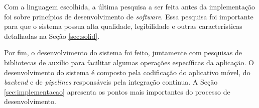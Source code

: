 Com a linguagem escolhida, a última pesquisa a ser feita antes da implementação foi sobre princípios de desenvolvimento de \textit{software}. Essa pesquisa foi importante para que o sistema possua alta qualidade, legibilidade e outras características detalhadas na Seção \ref{sec:solid}.

Por fim, o desenvolvimento do sistema foi feito, juntamente com pesquisas de bibliotecas de auxílio para facilitar algumas operações específicas da aplicação. O desenvolvimento do sistema é composto pela codificação do aplicativo móvel, do \textit{backend} e de \textit{pipelines} responsáveis pela integração contínua. A Seção \ref{sec:implementacao} apresenta os pontos mais importantes do processo de desenvolvimento.
